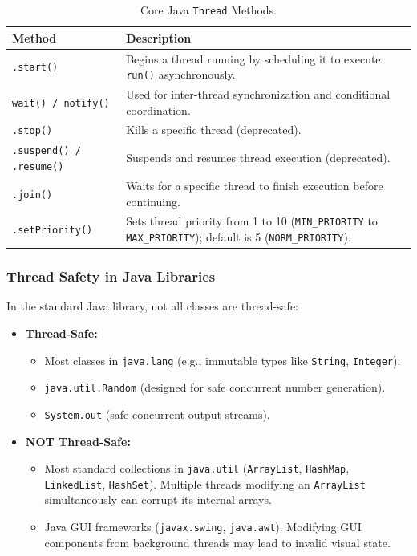 \documentclass[conference]{IEEEtran}
\begin{document}
\begin{table}[H]
    \centering
    \footnotesize
    \begin{tabular}{p{2.6cm}p{5.4cm}}
        \toprule
        \textbf{Method} & \textbf{Description} \\
        \midrule
        \texttt{.start()} & Begins a thread running by scheduling it to execute \texttt{run()} asynchronously. \\
        \addlinespace
        \texttt{wait() / notify()} & Used for inter-thread synchronization and conditional coordination. \\
        \addlinespace
        \texttt{.stop()} & Kills a specific thread (deprecated). \\
        \addlinespace
        \texttt{.suspend() / .resume()} & Suspends and resumes thread execution (deprecated). \\
        \addlinespace
        \texttt{.join()} & Waits for a specific thread to finish execution before continuing. \\
        \addlinespace
        \texttt{.setPriority()} & Sets thread priority from 1 to 10 (\texttt{MIN\_PRIORITY} to \texttt{MAX\_PRIORITY}); default is 5 (\texttt{NORM\_PRIORITY}). \\
        \bottomrule
    \end{tabular}
    \caption{Core Java \texttt{Thread} Methods.}
    \label{tab:java_thread_methods}
\end{table}

\subsubsection{Thread Safety in Java Libraries}

\noindent In the standard Java library, not all classes are thread-safe:

\begin{itemize}
    \item \textbf{Thread-Safe:}
    \begin{itemize}
        \item Most classes in \texttt{java.lang} (e.g., immutable types like \texttt{String}, \texttt{Integer}).
        \item \texttt{java.util.Random} (designed for safe concurrent number generation).
        \item \texttt{System.out} (safe concurrent output streams).
    \end{itemize}
    \item \textbf{NOT Thread-Safe:}
    \begin{itemize}
        \item Most standard collections in \texttt{java.util} (\texttt{ArrayList}, \texttt{HashMap}, \texttt{LinkedList}, \texttt{HashSet}). Multiple threads modifying an \texttt{ArrayList} simultaneously can corrupt its internal arrays.
        \item Java GUI frameworks (\texttt{javax.swing}, \texttt{java.awt}). Modifying GUI components from background threads may lead to invalid visual state.
    \end{itemize}
\end{itemize}
\end{document}
